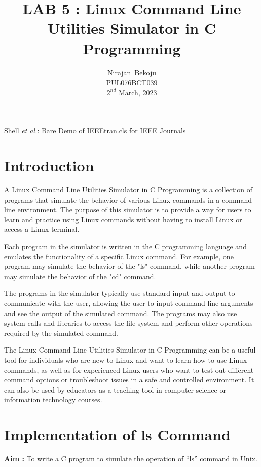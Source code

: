 \documentclass[journal,onecolumn]{IEEEtran}
\begin{document}
\title{LAB 5 : Linux Command Line Utilities Simulator in C Programming}

\author{Nirajan~Bekoju \\ PUL076BCT039 \\ $2^{nd}$ March, 2023}

%
{Shell \MakeLowercase{\textit{et al.}}: Bare Demo of IEEEtran.cls for IEEE Journals}

\maketitle

\IEEEpeerreviewmaketitle

\section{Introduction}
A Linux Command Line Utilities Simulator in C Programming is a collection of programs that simulate the behavior of various Linux commands in a command line environment. The purpose of this simulator is to provide a way for users to learn and practice using Linux commands without having to install Linux or access a Linux terminal.

Each program in the simulator is written in the C programming language and emulates the functionality of a specific Linux command. For example, one program may simulate the behavior of the "ls" command, while another program may simulate the behavior of the "cd" command.

The programs in the simulator typically use standard input and output to communicate with the user, allowing the user to input command line arguments and see the output of the simulated command. The programs may also use system calls and libraries to access the file system and perform other operations required by the simulated command.

The Linux Command Line Utilities Simulator in C Programming can be a useful tool for individuals who are new to Linux and want to learn how to use Linux commands, as well as for experienced Linux users who want to test out different command options or troubleshoot issues in a safe and controlled environment. It can also be used by educators as a teaching tool in computer science or information technology courses.

\section{Implementation of ls Command}
\textbf{Aim : } To write a C program to simulate the operation of “ls” command in Unix.
\end{document}
